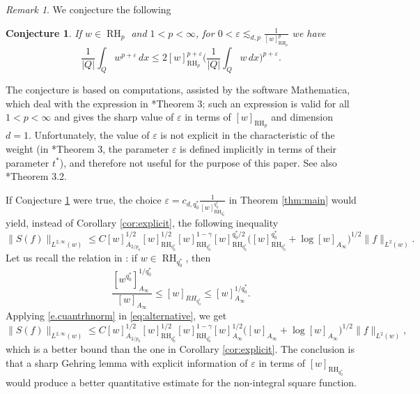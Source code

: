 \documentclass[11pt,reqno]{amsart}
\theoremstyle{plain} %
\newtheorem{conjecture}[equation]{Conjecture}
\newcommand{\1}{ \mathbbm{1}}   %
\theoremstyle{definition}
\theoremstyle{remark}
\newtheorem{remark}[equation]{Remark}
\numberwithin{equation}{section}
\begin{document}
\begin{remark}
We conjecture the following
\begin{conjecture}
\label{conj:gehring}
    If $w\in \operatorname{RH}_{p}$ and $1<p<\infty$, for $0 < \varepsilon \lesssim_{d,p} \frac{1}{ [w]_{\operatorname{RH}_{p}}^{p} }$ we have
    \begin{equation*}        
    \frac{1}{|Q|} \int_Q w^{p + \varepsilon} \, dx \le 2[w]_{\operatorname{RH}_{p}}^{p+\varepsilon}\Big( \frac{1}{|Q|} \int_Q w \, dx \Big)^{p + \varepsilon}.
    \end{equation*}
\end{conjecture}
The conjecture is based on computations, assisted by the software Mathematica, which deal with the expression in \cite{DW}*{Theorem 3}; such an expression is valid for all $1<p<\infty$ and gives the sharp value of $\varepsilon$ in terms of $[w]_{\operatorname{RH}_{p}}$ and dimension $d=1$.  Unfortunately, the value of $\varepsilon$ is not explicit in the characteristic of the weight (in \cite{DW}*{Theorem 3}, the parameter $\varepsilon$ is defined implicitly in terms of their parameter $t^*$), and therefore not useful for the purpose of this paper. See also \cite{Po}*{Theorem 3.2}.

If Conjecture \ref{conj:gehring} were true, the choice $\varepsilon = c_{d,q_0^*} \frac{1}{ [w]_{\operatorname{RH}_{q_0^*}}^{q_0^*} }$  in Theorem \ref{thm:main} would yield, instead of Corollary \ref{cor:explicit}, the following inequality
\begin{equation}
\label{eq:alternative}
\|S(f)\|_{L^{2,\infty}(w)} \le C [w]_{A_{2/p_0}}^{1/2} [w]_{ \operatorname{RH}_{q_0^*}}^{1/2}[w]_{ \operatorname{RH}_{q_0^*}}^{1-\gamma}   [w]_{\operatorname{RH}_{q_0^*}}^{q_0^*/2} \big(  [w]_{\operatorname{RH}_{q_0^*}}^{q_0^*} +\log[w]_{A_{\infty}}\big)^{1/2}\|f\|_{L^2(w)}.
\end{equation}
Let us recall the relation in \cite{KS}: if  $w\in \operatorname{RH}_{q_0^*}$, then 
\begin{equation}
\label{e.cuantrhnorm}
\frac{[w^{q_0^*}]_{A_{\infty}}^{1/q_0^*}}{[w]_{A_{\infty}}}\leq [w]_{RH_{q_0^*}}\leq [w]_{A_{\infty}}^{1/q_0^*}.
\end{equation}
Applying \eqref{e.cuantrhnorm} in \eqref{eq:alternative}, we get
$$
\|S(f)\|_{L^{2,\infty}(w)} \le C [w]_{A_{2/p_0}}^{1/2} [w]_{ \operatorname{RH}_{q_0^*}}^{1/2}[w]_{ \operatorname{RH}_{q_0^*}}^{1-\gamma}   [w]_{A_{\infty}}^{1/2} \big(  [w]_{A_{\infty}} +\log[w]_{A_{\infty}}\big)^{1/2}\|f\|_{L^2(w)},
$$
which is a better bound than the one in Corollary \ref{cor:explicit}. The conclusion is that a sharp Gehring lemma with explicit information of $\varepsilon$ in terms of $[w]_{ \operatorname{RH}_{q_0^*}}$ would produce a better quantitative estimate for the non-integral square function.
\end{remark}
\end{document}
